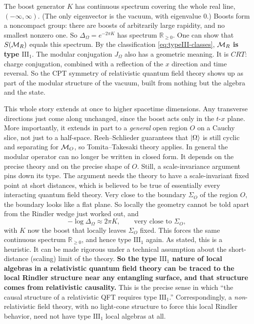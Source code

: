 The boost generator $K$ has continuous spectrum covering the whole real line, $(-\infty,\infty)$. (The only
eigenvector is the vacuum, with eigenvalue $0$.) Boosts form a noncompact group: there are boosts of
arbitrarily large rapidity, and no smallest nonzero one. So $\Delta_\Omega=e^{-2\pi K}$ has spectrum
$\mathbb R_{\ge0}$. One can show that $S(\mathcal{M}_R)$ equals this spectrum. By the classification
\eqref{eq:typeIII-classes}, \textbf{$\mathcal{M}_R$ is type $\mathrm{III}_1$}. The modular conjugation $J_\Omega$ also has
a geometric meaning. It is $CRT$: charge conjugation, combined with a reflection of the $x$ direction and time
reversal. So the CPT symmetry of relativistic quantum field theory shows up as part of the modular structure of
the vacuum, built from nothing but the algebra and the state.

This whole story extends at once to higher spacetime dimensions. Any transverse directions just come along
unchanged, since the boost acts only in the $t$-$x$ plane. More importantly, it extends in part to a
\emph{general} open region $O$ on a Cauchy slice, not just to a half-space. Reeh--Schlieder guarantees that
$\ket\Omega$ is still cyclic and separating for $\mathcal{M}_O$, so Tomita--Takesaki theory applies. In general the
modular operator can no longer be written in closed form. It depends on the precise theory and on the precise
shape of $O$. Still, a scale-invariance argument pins down its type. The argument needs the theory to have a
scale-invariant fixed point at short distances, which is believed to be true of essentially every interacting
quantum field theory. Very close to the boundary $\Sigma_O$ of the region $O$, the boundary looks like a flat
plane. So locally the geometry cannot be told apart from the Rindler wedge just worked out, and
\[
-\log\Delta_\Omega \approx 2\pi K, \qquad \text{very close to } \Sigma_O ,
\]
with $K$ now the boost that locally leaves $\Sigma_O$ fixed. This forces the same continuous spectrum
$\mathbb R_{\ge0}$, and hence type $\mathrm{III}_1$ again. As stated, this is a heuristic. It can be made
rigorous under a technical assumption about the short-distance (scaling) limit of the theory. \textbf{So the
type $\mathrm{III}_1$ nature of local algebras in a relativistic quantum field theory can be traced to the local
Rindler structure near any entangling surface, and that structure comes from relativistic causality.} This is
the precise sense in which ``the causal structure of a relativistic QFT requires type $\mathrm{III}_1$.''
Correspondingly, a \emph{non}-relativistic field theory, with no light-cone structure to force this local
Rindler behavior, need not have type $\mathrm{III}_1$ local algebras at all.

